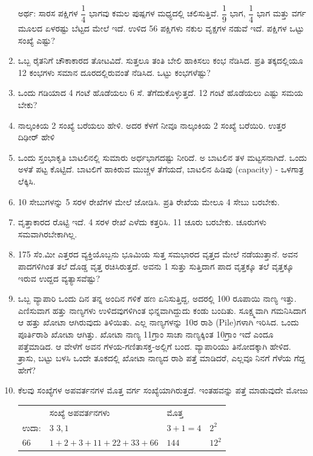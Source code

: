 \begin{enumerate}
ಅರ್ಥ: ಸಾರಸ ಪಕ್ಷಿಗಳ $\dfrac{1}{4}$ ಭಾಗವು ಕಮಲ ಪುಷ್ಪಗಳ ಮಧ್ಯದಲ್ಲಿ ಚಲಿಸುತ್ತಿವೆ. $\dfrac{1}{9}$ ಭಾಗ, $\dfrac{1}{4}$ ಭಾಗ ಮತ್ತು ವರ್ಗ ಮೂಲದ ಏಳರಷ್ಟು ಬೆಟ್ಟದ ಮೇಲೆ ಇದೆ. ಉಳಿದ 56 ಪಕ್ಷಿಗಳು ನಕುಲ ವೃಕ್ಷಗಳ ನಡುವೆ ಇದೆ. ಪಕ್ಷಿಗಳ ಒಟ್ಟು ಸಂಖ್ಯೆ ಎಷ್ಟು? 

\item ಒಬ್ಬ ರೈತನಿಗೆ ಚೌಕಾಕಾರದ ತೋಟವಿದೆ. ಸುತ್ತಲೂ ತಂತಿ ಬೇಲಿ ಹಾಕಿಸಲು ಕಂಭ ನೆಡಿಸಿದ. ಪ್ರತಿ ತಕ್ಕದಲ್ಲಿಯೂ 12 ಕಂಭಗಳು ಸಮಾನ ದೂರದಲ್ಲಿರುವಂತೆ ನೆಡಿಸಿದ. ಒಟ್ಟು ಕಂಭಗಳೆಷ್ಟು?

\item ಒಂದು ಗಡಿಯಾದ 4 ಗಂಟೆ ಹೊಡೆಯಲು 6 ಸೆ. ತೆಗೆದುಕೊಳ್ಳುತ್ತದೆ. 12 ಗಂಟೆ ಹೊಡೆಯಲು ಎಷ್ಟು ಸಮಯ ಬೇಕು? 

\item ನಾಲ್ಕಂಕಿಯ 2 ಸಂಖ್ಯೆ ಬರೆಯಲು ಹೇಳಿ. ಅದರ ಕೆಳಗೆ ನೀವೂ ನಾಲ್ಕಂಕಿಯ 2 ಸಂಖ್ಯೆ ಬರೆಯಿರಿ. ಉತ್ತರ ದಿಢೀರ್ ಹೇಳಿ

\item ಒಂದು ಸ್ತಂಭಾಕೃತಿ ಬಾಟಲಿನಲ್ಲಿ ಸುಮಾರು ಅರ್ಧಭಾಗದಷ್ಟು ನೀರಿದೆ. ಅ ಬಾಟಲಿನ ತಳ ಮಟ್ಟಸನಾಗಿದೆ. ಒಂದು ಅಳತೆ ಪಟ್ಟ ಕೊಟ್ಟಿದೆ. ಬಾಟಲಿಗೆ ಹಾಕಿರುವ ಮುಚ್ಚಳ ತೆಗೆಯದೆ, ಬಾಟಲಿನ ಹಿಡಿಪು (capacity) - ಒಳಗಾತ್ರ ಲೆಕ್ಕಿಸಿ. 

\item 10 ಸೇಬುಗಳನ್ನು 5 ಸರಳ ರೇಖೆಗಳ ಮೇಲೆ ಜೋಡಿಸಿ. ಪ್ರತಿ ರೇಖೆಯ ಮೇಲೂ 4 ಸೇಬು ಬರಬೇಕು. 

\item ವೃತ್ತಾಕಾರದ ರೊಟ್ಟಿ ಇದೆ. 4 ಸರಳ ರೇಖೆ ಎಳೆದು ಕತ್ತರಿಸಿ. 11 ಚೂರು ಬರಬೇಕು. ಚೂರುಗಳು ಸಮವಾಗಿರಬೇಕಾಗಿಲ್ಲ. 

\item 175 ಸೆಂ.ಮೀ ಎತ್ತರದ ವ್ಯಕ್ತಿಯೊಬ್ಬನು ಭೂಮಿಯ ಸುತ್ತ ಸಮಭಾರದ ವೃತ್ತದ ಮೇಲೆ ನಡೆಯುತ್ತಾನೆ. ಅವನ ಪಾದಗಳಿಗಿಂತ ತಲೆ ದೊಡ್ಡ ವೃತ್ತ ರಚಿಸಿರುತ್ತದೆ. ಅವನು 1 ಸುತ್ತು ಸುತ್ತಿದಾಗ ಪಾದ ವೃತ್ತಕ್ಕೂ ತಲೆ ವೃತ್ತಕ್ಕೂ ಇರುವ ಉದ್ದದ ವ್ಯತ್ಯಾಸವೆಷ್ಟು? 

\item ಒಬ್ಬ ವ್ಯಾಪಾರಿ ಒಂದು ದಿನ ತನ್ನ ಅಂದಿನ ಗಳಿಕೆ ಹಣ ಏನಿಸುತ್ತಿದ್ದ, ಅದರಲ್ಲಿ 100 ರೂಪಾಯಿ ನಾಣ್ಯ ಇತ್ತು. ಎಣಿಸುವಾಗ ಹತ್ತು ನಾಣ್ಯಗಳು ಉಳಿದವುಗಳಿಗಿಂತ ಭಿನ್ನವಾಗಿದ್ದುದು ಕಂಡು ಬಂದಿತು. ಸೂಕ್ಷ್ಮವಾಗಿ ಗಮನಿಸಿದಾಗ ಆ ಹತ್ತು ಖೋಟಾ ಆಗಿರುವುದು ತಿಳಿಯಿತು. ಎಲ್ಲ ನಾಣ್ಯಗಳನ್ನು 10ರ ರಾಶಿ (Pile)ಗಳಾಗಿ ಇರಿಸಿದ. ಒಂದು ಪೂರ್ತಿರಾಶಿ ಖೋಟಾ ಆಗಿತ್ತು. ಖೋಟಾ ನಾಣ್ಯ 11ಗ್ರಾಂ ಸಾಚಾ ನಾಣ್ಯಕ್ಕಿಂತ 10ಗ್ರಾಂ ಇದೆ ಎಂದೂ ಪತ್ತೆಮಾಡಿದ. ಆ ವೇಳೆಗೆ ಅವನ ಗೆಳಯ-ಗಣಿತಾಸಕ್ತ-ಅಲ್ಲಿಗೆ ಬಂದ. ವ್ಯಾಪಾರಿಯು ತಿನೋದಕ್ಕಾಗಿ ಹೇಳಿದ. ತ್ರಾಸು, ಬಟ್ಟು ಬಳಸಿ ಒಂದೇ ತೂಕದಲ್ಲಿ ಖೋಟಾ ನಾಣ್ಯದ ರಾಶಿ ಪತ್ತೆ ಮಾಡಿದರೆ, ಎಲ್ಲವೂ ನಿನಗೆ ಗೆಳೆಯ ಗೆದ್ದ ಹೇಗೆ?

\item ಕೆಲವು ಸಂಖ್ಯೆಗಳ ಅಪವರ್ತನಗಳ ಮೊತ್ತ ವರ್ಗ ಸಂಖ್ಯೆಯಾಗಿರುತ್ತದೆ. ಇಂತಹವನ್ನು ಪತ್ತೆ ಮಾಡುವುದೇ ಮೋಜು 

\begin{tabular}{llll}
& ಸಂಖ್ಯೆ \quad ಅಪವರ್ತನಗಳು & ಮೊತ್ತ & \\
ಉದಾ: & $3$ \quad $3, 1$ & $3 + 1 = 4$ & $2^{2}$\\
$66$ & $1+2+3+11+22+33+66$ & $144$ & $12^{2}$
\end{tabular}


\end{enumerate}
